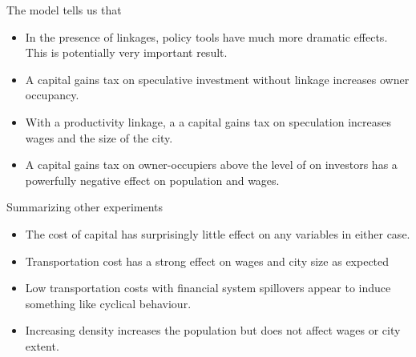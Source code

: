 \documentclass[notes=show]{beamer} %
\begin{document}

\begin{frame}{The model tells us that}  \Large
\begin {itemize}[<+-|alert@+>]
\item In the presence of linkages, policy tools have much more dramatic effects. This is potentially very important result. 

\item  A capital gains tax on speculative investment without linkage increases owner occupancy. 

\item With a productivity linkage, a a capital gains tax on speculation increases wages and the size of the city. 
\item  A capital gains tax on owner-occupiers above the level of on investors has a powerfully negative effect on population and wages.
\end{itemize}
\end{frame}





\begin{frame}{Summarizing other experiments} \Large
\begin {itemize}[<+-|alert@+>]

\item  The cost of capital has surprisingly little effect on any variables in either case.

\item  Transportation cost has a strong effect on wages and city size as expected 
 
\item Low transportation costs with financial system spillovers appear to induce something like cyclical behaviour.

\item  Increasing density increases the population but does not affect wages or city extent.
\end{itemize}
\end{frame}%
\end{document}
